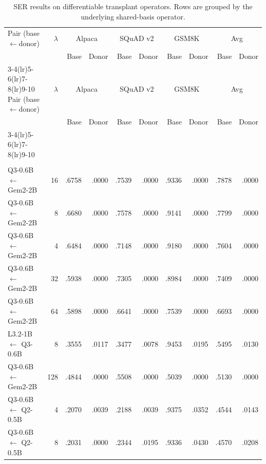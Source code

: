 \begingroup
\small
\setlength{\tabcolsep}{1.8pt}
\renewcommand{\arraystretch}{1.05}
\begin{longtable}{p{}rrrrrrrrr}
\caption{SER results on differentiable transplant operators. Rows are grouped by the underlying shared-basis operator.}\label{tab:app:altops:ser} \\
\toprule
Pair (base$\leftarrow$donor) & $\lambda$ & \multicolumn{2}{c}{Alpaca} & \multicolumn{2}{c}{SQuAD v2} & \multicolumn{2}{c}{GSM8K} & \multicolumn{2}{c}{Avg} \\
 & & Base & Donor & Base & Donor & Base & Donor & Base & Donor \\
\cmidrule(lr){3-4}\cmidrule(lr){5-6}\cmidrule(lr){7-8}\cmidrule(lr){9-10}
\midrule
\endfirsthead
\toprule
Pair (base$\leftarrow$donor) & $\lambda$ & \multicolumn{2}{c}{Alpaca} & \multicolumn{2}{c}{SQuAD v2} & \multicolumn{2}{c}{GSM8K} & \multicolumn{2}{c}{Avg} \\
 & & Base & Donor & Base & Donor & Base & Donor & Base & Donor \\
\cmidrule(lr){3-4}\cmidrule(lr){5-6}\cmidrule(lr){7-8}\cmidrule(lr){9-10}
\midrule
\endhead
\midrule \multicolumn{10}{r}{\emph{Continued on next page}} \\
\endfoot
\bottomrule
\endlastfoot
\multicolumn{10}{l}{\textbf{FOCUS}} \\
\addlinespace[2pt]
Q3-0.6B $\leftarrow$ Gem2-2B & 16 & .6758 & .0000 & .7539 & .0000 & .9336 & .0000 & .7878 & .0000 \\
Q3-0.6B $\leftarrow$ Gem2-2B & 8 & .6680 & .0000 & .7578 & .0000 & .9141 & .0000 & .7799 & .0000 \\
Q3-0.6B $\leftarrow$ Gem2-2B & 4 & .6484 & .0000 & .7148 & .0000 & .9180 & .0000 & .7604 & .0000 \\
Q3-0.6B $\leftarrow$ Gem2-2B & 32 & .5938 & .0000 & .7305 & .0000 & .8984 & .0000 & .7409 & .0000 \\
Q3-0.6B $\leftarrow$ Gem2-2B & 64 & .5898 & .0000 & .6641 & .0000 & .7539 & .0000 & .6693 & .0000 \\
L3.2-1B $\leftarrow$ Q3-0.6B & 8 & .3555 & .0117 & .3477 & .0078 & .9453 & .0195 & .5495 & .0130 \\
Q3-0.6B $\leftarrow$ Gem2-2B & 128 & .4844 & .0000 & .5508 & .0000 & .5039 & .0000 & .5130 & .0000 \\
Q3-0.6B $\leftarrow$ Q2-0.5B & 4 & .2070 & .0039 & .2188 & .0039 & .9375 & .0352 & .4544 & .0143 \\
Q3-0.6B $\leftarrow$ Q2-0.5B & 8 & .2031 & .0000 & .2344 & .0195 & .9336 & .0430 & .4570 & .0208 \\

\end{longtable}
